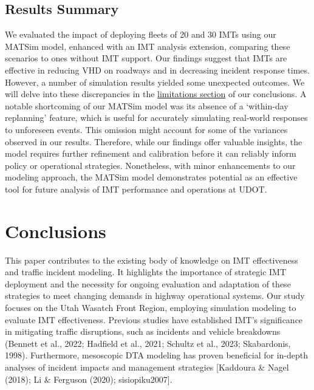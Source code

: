 \documentclass[fancy, oneside, mastersfancy, ms]{byuthesis}
\begin{document}
\hypertarget{results-summary}{%
\section{Results Summary}\label{results-summary}}

We evaluated the impact of deploying fleets of 20 and 30 IMTs using our
MATSim model, enhanced with an IMT analysis extension, comparing these
scenarios to ones without IMT support. Our findings suggest that IMTs
are effective in reducing VHD on roadways and in decreasing incident
response times. However, a number of simulation results yielded some
unexpected outcomes. We will delve into these discrepancies in the
\protect\hyperlink{sec-limitations}{limitations section} of our
conclusions. A notable shortcoming of our MATSim model was its absence
of a `within-day replanning' feature, which is useful for accurately
simulating real-world responses to unforeseen events. This omission
might account for some of the variances observed in our results.
Therefore, while our findings offer valuable insights, the model
requires further refinement and calibration before it can reliably
inform policy or operational strategies. Nonetheless, with minor
enhancements to our modeling approach, the MATSim model demonstrates
potential as an effective tool for future analysis of IMT performance
and operations at UDOT.


\hypertarget{sec-conclusions}{%
\chapter{Conclusions}\label{sec-conclusions}}

This paper contributes to the existing body of knowledge on IMT
effectiveness and traffic incident modeling. It highlights the
importance of strategic IMT deployment and the necessity for ongoing
evaluation and adaptation of these strategies to meet changing demands
in highway operational systems. Our study focuses on the Utah Wasatch
Front Region, employing simulation modeling to evaluate IMT
effectiveness. Previous studies have established IMT's significance in
mitigating traffic disruptions, such as incidents and vehicle breakdowns
(Bennett et al., 2022; Hadfield et al., 2021; Schultz et al., 2023;
Skabardonis, 1998). Furthermore, mesoscopic DTA modeling has proven
beneficial for in-depth analyses of incident impacts and management
strategies {[}Kaddoura \& Nagel (2018); Li \& Ferguson (2020);
sisiopiku2007{]}.
\end{document}
